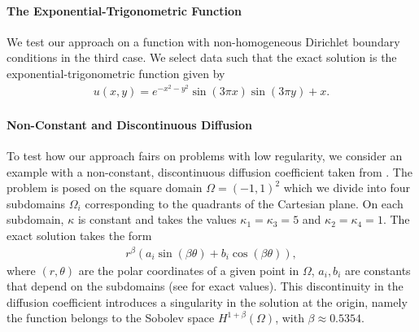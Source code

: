 \documentclass[preprint,12pt]{elsarticle}
\begin{document}
\paragraph{The Exponential-Trigonometric Function} We test our approach on a function with non-homogeneous Dirichlet boundary conditions in the third case. We select data such that the exact solution is the exponential-trigonometric function given by
\begin{align}
    u(x, y) = e^{-x^2 - y^2}\sin(3 \pi x)\sin(3 \pi y) + x.
\end{align}
\paragraph{Non-Constant and Discontinuous Diffusion} 
To test how our approach fairs on problems with low regularity, we consider an example with a non-constant, discontinuous diffusion coefficient taken from \cite{riviere2003posteriori}. The problem is posed on the square domain $\Omega = (-1,1)^2$ which we divide into four subdomains $\Omega_i$ corresponding to the quadrants of the Cartesian plane. On each subdomain, $\kappa$ is constant and takes the values $\kappa_1 = \kappa_3 = 5$ and $\kappa_2 = \kappa_4 = 1$. %
The exact solution takes the form
\begin{align}
r^{\beta}(a_i \sin(\beta \theta) + b_i \cos(\beta \theta)),
\end{align}
%
where $(r, \theta)$ are the polar coordinates of a given point in $\Omega$, $a_i, b_i$ are constants that depend on the subdomains (see \cite{riviere2003posteriori} for exact values). This discontinuity in the diffusion coefficient introduces a singularity in the solution at the origin, namely the function belongs to the Sobolev space $H^{1+\beta}(\Omega)$, with $\beta \approx 0.5354$.

\end{document}
